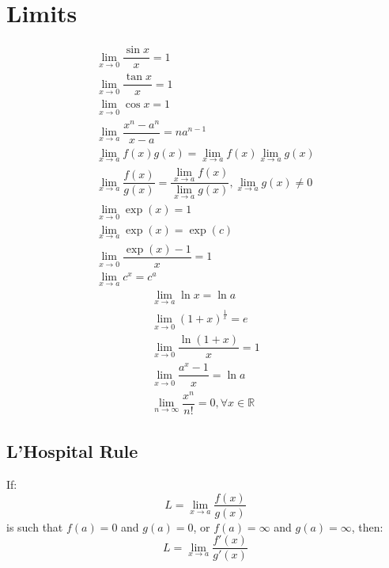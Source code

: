 \large{\chapter{Limits}}
\begin{align}
	\lim_{x\to0} \dfrac{\sin x}{x}=1\\
	\lim_{x\to0} \dfrac{\tan x}{x}=1\\
	\lim_{x\to0} \cos x=1\\
	\lim_{x\to a} \dfrac{x^n-a^n}{x-a}=na^{n-1}\\
	\lim_{x\to a} f(x)g(x)=\lim_{x\to a} f(x)\lim_{x\to a} g(x)\\
	\lim_{x\to a} \dfrac{f(x)}{g(x)}=\dfrac{\lim_{x\to a} f(x)}{\lim_{x\to a} g(x)}, \lim_{x\to a} g(x) \neq 0\\
	\lim_{x\to0} \exp(x)=1\\
	\lim_{x\to a} \exp(x)=\exp(c)\\
	\lim_{x\to0} \dfrac{\exp(x)-1}{x}=1\\
	\lim_{x\to a} c^x=c^a
\end{align}
\begin{align}
	\lim_{x\to a} \ln x=\ln a\\
	\lim_{x\to0} (1+x)^{\frac{1}{x}}=e\\
	\lim_{x\to0} \dfrac{\ln (1+x)}{x}=1\\
	\lim_{x\to0} \dfrac{a^x-1}{x}=\ln a\\
	\lim_{n\to\infty} \dfrac{x^n}{n!}=0, \forall x\in\mathbb{R}
\end{align}

\section{L'Hospital Rule}
If:
\begin{equation}
	L=\lim_{x\to a} \dfrac{f(x)}{g(x)}\nonumber
\end{equation}
is such that $f(a)=0$ and $g(a)=0$, or $f(a)=\infty$ and $g(a)=\infty$, then:
\begin{equation}
	L=\lim_{x\to a} \dfrac{f'(x)}{g'(x)}\nonumber
\end{equation}

